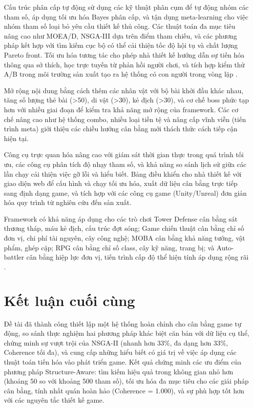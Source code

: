 Cấu trúc phân cấp tự động sử dụng các kỹ thuật phân cụm để tự động nhóm các tham số, áp dụng tối ưu hóa Bayes phân cấp, và tận dụng meta-learning cho việc nhóm tham số loại bỏ yêu cầu thiết kế thủ công. Các thuật toán đa mục tiêu nâng cao như MOEA/D, NSGA-III dựa trên điểm tham chiếu, và các phương pháp kết hợp với tìm kiếm cục bộ có thể cải thiện tốc độ hội tụ và chất lượng Pareto front. Tối ưu hóa tương tác cho phép nhà thiết kế hướng dẫn sự tiến hóa thông qua sở thích, học trực tuyến từ phản hồi người chơi, và tích hợp kiểm thử A/B trong môi trường sản xuất tạo ra hệ thống có con người trong vòng lặp \cite{coello2007evolutionary}.

Mở rộng nội dung bằng cách thêm các nhân vật với bộ bài khởi đầu khác nhau, tăng số lượng thẻ bài (>50), di vật (>30), kẻ địch (>30), và cơ chế boss phức tạp hơn với nhiều giai đoạn để kiểm tra khả năng mở rộng của framework. Các cơ chế nâng cao như hệ thống combo, nhiều loại tiền tệ và nâng cấp vĩnh viễn (tiến trình meta) giới thiệu các chiều hướng cân bằng mới thách thức cách tiếp cận hiện tại.

Công cụ trực quan hóa nâng cao với giám sát thời gian thực trong quá trình tối ưu, các công cụ phân tích độ nhạy tham số, và khả năng so sánh lịch sử giữa các lần chạy cải thiện việc gỡ lỗi và hiểu biết. Bảng điều khiển cho nhà thiết kế với giao diện web để cấu hình và chạy tối ưu hóa, xuất dữ liệu cân bằng trực tiếp sang định dạng game, và tích hợp với các công cụ game (Unity/Unreal) đơn giản hóa quy trình từ nghiên cứu đến sản xuất.

Framework có khả năng áp dụng cho các trò chơi Tower Defense cân bằng sát thương tháp, máu kẻ địch, cấu trúc đợt sóng; Game chiến thuật cân bằng chỉ số đơn vị, chi phí tài nguyên, cây công nghệ; MOBA cân bằng khả năng tướng, vật phẩm, ghép cặp; RPG cân bằng chỉ số class, cây kỹ năng, trang bị; và Auto-battler cân bằng hiệp lực đơn vị, tiến trình cấp độ thể hiện tính áp dụng rộng rãi \cite{yannakakis2018artificial}.

\section{Kết luận cuối cùng}

Đề tài đã thành công thiết lập một hệ thống hoàn chỉnh cho cân bằng game tự động, so sánh thực nghiệm hai phương pháp khác biệt căn bản với dữ liệu cụ thể, chứng minh sự vượt trội của NSGA-II (nhanh hơn 33\%, đa dạng hơn 33\%, Coherence tối đa), và cung cấp những hiểu biết có giá trị về việc áp dụng các thuật toán tiến hóa vào phát triển game. Kết quả chứng minh các ưu điểm của phương pháp Structure-Aware: tìm kiếm hiệu quả trong không gian nhỏ hơn (khoảng 50 so với khoảng 500 tham số), tối ưu hóa đa mục tiêu cho các giải pháp cân bằng, tính nhất quán hoàn hảo (Coherence = 1.000), và sự phù hợp tốt hơn với các nguyên tắc thiết kế game.

